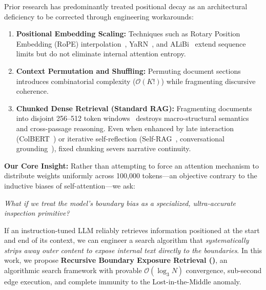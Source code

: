 Prior research has predominantly treated positional decay as an architectural deficiency to be corrected through engineering workarounds:
\begin{enumerate}
    \item \textbf{Positional Embedding Scaling:} Techniques such as Rotary Position Embedding (RoPE) interpolation~\cite{su2024roformer,chen2023extending}, YaRN~\cite{peng2023yarn}, and ALiBi~\cite{press2022train} extend sequence limits but do not eliminate internal attention entropy.
    \item \textbf{Context Permutation and Shuffling:} Permuting document sections introduces combinatorial complexity ($\mathcal{O}(K!)$) while fragmenting discursive coherence.
    \item \textbf{Chunked Dense Retrieval (Standard RAG):} Fragmenting documents into disjoint 256--512 token windows~\cite{lewis2020retrieval,karpukhin2020dense,gao2023precise,robertson2009probabilistic} destroys macro-structural semantics and cross-passage reasoning. Even when enhanced by late interaction (ColBERT~\cite{khattab2020colbert}) or iterative self-reflection (Self-RAG~\cite{asai2023selfrag}, conversational grounding~\cite{shuster2021retrieval}), fixed chunking severs narrative continuity.
\end{enumerate}

\noindent\textbf{Our Core Insight:} Rather than attempting to force an attention mechanism to distribute weights uniformly across 100,000 tokens—an objective contrary to the inductive biases of self-attention—we ask:
\begin{center}
\emph{What if we treat the model's boundary bias as a specialized, ultra-accurate inspection primitive?}
\end{center}

If an instruction-tuned LLM reliably retrieves information positioned at the start and end of its context, we can engineer a search algorithm that \emph{systematically strips away outer content to expose internal text directly to the boundaries}. In this work, we propose \textbf{Recursive Boundary Exposure Retrieval (\RBER)}, an algorithmic search framework with provable $\mathcal{O}(\log_3 N)$ convergence, sub-second edge execution, and complete immunity to the Lost-in-the-Middle anomaly.

